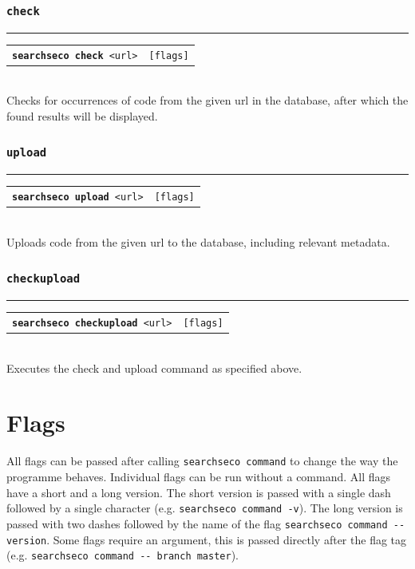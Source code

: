 \documentclass{article}
\begin{document}
\subsubsection*{\texttt{check}} \rule{\linewidth}{0.5pt} \vspace{.1cm}

\begin{tabularx}{\textwidth}{lX}
    \texttt{\textbf{searchseco check} <url>} & \texttt{[flags]}
\end{tabularx} 
\vspace{.15cm} \\
Checks for occurrences of code from the given url in the database, after which the found results will be displayed.\par

\subsubsection*{\texttt{upload}} \rule{\linewidth}{0.5pt} \vspace{.1cm}

\begin{tabularx}{\textwidth}{lX}
    \texttt{\textbf{searchseco upload} <url>} & \texttt{[flags]}
\end{tabularx} 
\vspace{.15cm} \\
Uploads code from the given url to the database, including relevant metadata. \par

\subsubsection*{\texttt{checkupload}} \rule{\linewidth}{0.5pt} \vspace{.1cm}

\begin{tabularx}{\textwidth}{lX}
    \texttt{\textbf{searchseco checkupload} <url>} & \texttt{[flags]}
\end{tabularx} 
\vspace{.15cm} \\
Executes the check and upload command as specified above. \par

\clearpage
\section{Flags}
\label{flags}
All flags can be passed after calling \texttt{searchseco command} to change the way the programme behaves. Individual flags can be run without a command. All flags have a short and a long version. The short version is passed with a single dash followed by a single character (e.g. \texttt{searchseco command -v}). The long version is passed with two dashes followed by the name of the flag \texttt{searchseco command -{}-version}. Some flags require an argument, this is passed directly after the flag tag (e.g. \texttt{searchseco command -{}- branch master}).
\end{document}
